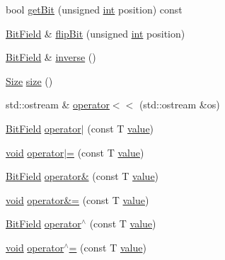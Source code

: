\begin{DoxyCompactItemize}
bool \hyperlink{structmc_1_1_bit_field_a4c3809c2559bebab2a22f983b92d88f4}{get\+Bit} (unsigned \hyperlink{_s_d_l__thread_8h_a6a64f9be4433e4de6e2f2f548cf3c08e}{int} position) const 
\item 
\hyperlink{structmc_1_1_bit_field}{Bit\+Field} \& \hyperlink{structmc_1_1_bit_field_a24b751df3cc0d33a5891141d2a53e985}{flip\+Bit} (unsigned \hyperlink{_s_d_l__thread_8h_a6a64f9be4433e4de6e2f2f548cf3c08e}{int} position)
\item 
\hyperlink{structmc_1_1_bit_field}{Bit\+Field} \& \hyperlink{structmc_1_1_bit_field_a4630156bb00d06ca64a3107318d66d6f}{inverse} ()
\item 
\hyperlink{namespacemc_ad1c06461067735b3b17e0df612532c4e}{Size} \hyperlink{structmc_1_1_bit_field_a6c48d4dec674ff73a1a06239e9b6175d}{size} ()
\item 
std\+::ostream \& \hyperlink{structmc_1_1_bit_field_a08bb4029a5c575e4ccfd03b720532353}{operator$<$$<$} (std\+::ostream \&os)
\item 
\hyperlink{structmc_1_1_bit_field}{Bit\+Field} \hyperlink{structmc_1_1_bit_field_a3f1651fa9c9561c938e515587ebc33de}{operator$\vert$} (const T \hyperlink{_s_d_l__opengl__glext_8h_a8ad81492d410ff2ac11f754f4042150f}{value})
\item 
\hyperlink{_s_d_l__opengles2__gl2ext_8h_ae5d8fa23ad07c48bb609509eae494c95}{void} \hyperlink{structmc_1_1_bit_field_a839e7d552983d6d8225fbe806c11267c}{operator$\vert$=} (const T \hyperlink{_s_d_l__opengl__glext_8h_a8ad81492d410ff2ac11f754f4042150f}{value})
\item 
\hyperlink{structmc_1_1_bit_field}{Bit\+Field} \hyperlink{structmc_1_1_bit_field_a6a77fd2eb84d02dbc8ae25ed2dac9f21}{operator\&} (const T \hyperlink{_s_d_l__opengl__glext_8h_a8ad81492d410ff2ac11f754f4042150f}{value})
\item 
\hyperlink{_s_d_l__opengles2__gl2ext_8h_ae5d8fa23ad07c48bb609509eae494c95}{void} \hyperlink{structmc_1_1_bit_field_a456ed982073855a429d599fa6116b381}{operator\&=} (const T \hyperlink{_s_d_l__opengl__glext_8h_a8ad81492d410ff2ac11f754f4042150f}{value})
\item 
\hyperlink{structmc_1_1_bit_field}{Bit\+Field} \hyperlink{structmc_1_1_bit_field_ad27805f037eb8bdb6ab509f4d6663fb0}{operator$^\wedge$} (const T \hyperlink{_s_d_l__opengl__glext_8h_a8ad81492d410ff2ac11f754f4042150f}{value})
\item 
\hyperlink{_s_d_l__opengles2__gl2ext_8h_ae5d8fa23ad07c48bb609509eae494c95}{void} \hyperlink{structmc_1_1_bit_field_ab7cec8f0964de4d63496d8a4fbbdf229}{operator$^\wedge$=} (const T \hyperlink{_s_d_l__opengl__glext_8h_a8ad81492d410ff2ac11f754f4042150f}{value})

\end{DoxyCompactItemize}
